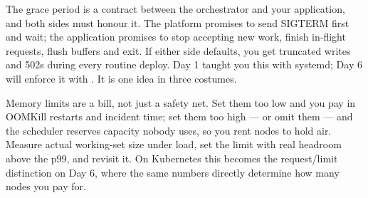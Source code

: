 \begin{reliability}
The grace period is a contract between the orchestrator and your application, and both sides must honour it. The platform promises to send SIGTERM first and wait; the application promises to stop accepting new work, finish in-flight requests, flush buffers and exit. If either side defaults, you get truncated writes and 502s during every routine deploy. Day 1 taught you this with systemd; Day 6 will enforce it with . It is one idea in three costumes.
\end{reliability}

\begin{costnote}
Memory limits are a bill, not just a safety net. Set them too low and you pay in OOMKill restarts and incident time; set them too high --- or omit them --- and the scheduler reserves capacity nobody uses, so you rent nodes to hold air. Measure actual working-set size under load, set the limit with real headroom above the p99, and revisit it. On Kubernetes this becomes the request/limit distinction on Day 6, where the same numbers directly determine how many nodes you pay for.
\end{costnote}

